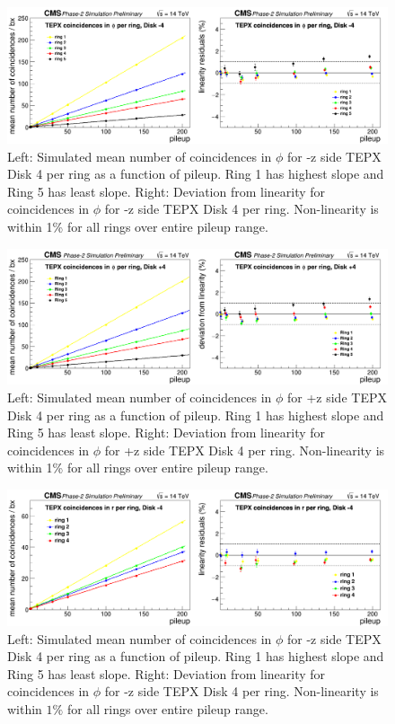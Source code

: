 \begin{figure}[H]
  \centering
  \includegraphics[width=1\columnwidth]{./coincidencesinphiperringD-4.png}
  \caption{Left: Simulated mean number of coincidences in $\phi$ for -z side TEPX Disk 4 per ring as a function of pileup. Ring 1 has highest slope and Ring 5 has least slope. Right: Deviation from linearity for coincidences in $\phi$ for -z side TEPX Disk 4 per ring. Non-linearity is within 1\% for all rings over entire pileup range.}
  \label{fig:CMS}
\end{figure}

\begin{figure}[H]
  \centering
  \includegraphics[width=1\columnwidth]{./coincidencesinphiperringD+4.png}
  \caption{Left: Simulated mean number of coincidences in $\phi$ for +z side TEPX Disk 4 per ring as a function of pileup. Ring 1 has highest slope and Ring 5 has least slope. Right: Deviation from linearity for coincidences in $\phi$ for +z side TEPX Disk 4 per ring. Non-linearity is within 1\% for all rings over entire pileup range.}
  \label{fig:CMS}
\end{figure}


\begin{figure}[H]
  \centering
  \includegraphics[width=1\columnwidth]{./coincidencesinrperringD-4.png}
  \caption{Left: Simulated mean number of coincidences in $\phi$ for -z side TEPX Disk 4 per ring as a function of pileup. Ring 1 has highest slope and Ring 5 has least slope. Right: Deviation from linearity for coincidences in $\phi$ for -z side TEPX Disk 4 per ring. Non-linearity is within $1\%$ for all rings over entire pileup range.}
  \label{fig:CMS}
\end{figure}


